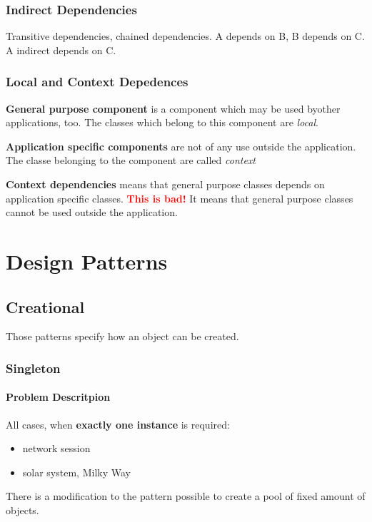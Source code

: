 \documentclass{report}
\begin{document}
\section{Indirect Dependencies}
Transitive dependencies, chained dependencies. A depends on B, B depends on C. A indirect depends on C.

\section{Local and Context Depedences}
\textbf{General purpose component} is a component which may be used byother applications, too. The classes which belong to this component are \textit{local}.

\textbf{Application specific components} are not of any use outside the application. The classe belonging to the component are called \textit{context}

\textbf{Context dependencies} means that general purpose classes depends on application specific classes. \textbf{\textcolor{red}{This is bad!}}
It means that general purpose classes cannot be used outside the application.




\part{Design Patterns}



\chapter{Creational}
Those patterns specify how an object can be created.


\section{Singleton}

\subsection{Problem Descritpion}
All cases, when \textbf{exactly one instance} is required:
\begin{itemize}
	\item network session
	\item solar system, Milky Way
\end{itemize}
There is a modification to the pattern possible to create a pool of fixed amount of objects.
\end{document}
